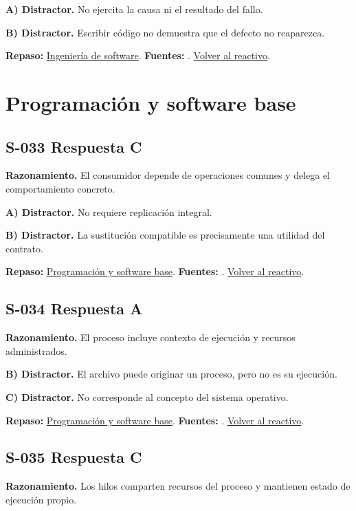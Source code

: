\textbf{A) Distractor. }No ejercita la causa ni el resultado del fallo.

\textbf{B) Distractor. }Escribir código no demuestra que el defecto no reaparezca.

\textbf{Repaso:} \hyperref[sec:s1]{Ingeniería de software}. \textbf{Fuentes:} \cite{scrum,swebok}. \hyperref[q:S-032]{Volver al reactivo}.\par\medskip

\section{Programación y software base}

\subsection*{S-033 \quad Respuesta C}\label{s:S-033}
\textbf{Razonamiento.} El consumidor depende de operaciones comunes y delega el comportamiento concreto.

\textbf{A) Distractor. }No requiere replicación integral.

\textbf{B) Distractor. }La sustitución compatible es precisamente una utilidad del contrato.

\textbf{Repaso:} \hyperref[sec:s2]{Programación y software base}. \textbf{Fuentes:} \cite{ostep,cppreference,compiler}. \hyperref[q:S-033]{Volver al reactivo}.\par\medskip

\subsection*{S-034 \quad Respuesta A}\label{s:S-034}
\textbf{Razonamiento.} El proceso incluye contexto de ejecución y recursos administrados.

\textbf{B) Distractor. }El archivo puede originar un proceso, pero no es su ejecución.

\textbf{C) Distractor. }No corresponde al concepto del sistema operativo.

\textbf{Repaso:} \hyperref[sec:s2]{Programación y software base}. \textbf{Fuentes:} \cite{ostep,cppreference,compiler}. \hyperref[q:S-034]{Volver al reactivo}.\par\medskip

\subsection*{S-035 \quad Respuesta C}\label{s:S-035}
\textbf{Razonamiento.} Los hilos comparten recursos del proceso y mantienen estado de ejecución propio.

